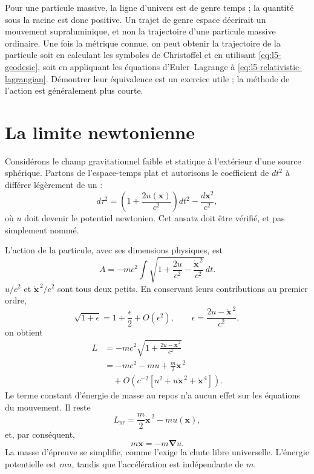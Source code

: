 Pour une particule massive, la ligne d’univers est de genre temps ; la quantité sous la racine est donc positive. Un trajet de genre espace décrirait un mouvement supraluminique, et non la trajectoire d’une particule massive ordinaire. Une fois la métrique connue, on peut obtenir la trajectoire de la particule soit en calculant les symboles de Christoffel et en utilisant \eqref{eq:l5-geodesic}, soit en appliquant les équations d’Euler--Lagrange à \eqref{eq:l5-relativistic-lagrangian}. Démontrer leur équivalence est un exercice utile ; la méthode de l’action est généralement plus courte.

\section{La limite newtonienne}

Considérons le champ gravitationnel faible et statique à l’extérieur d’une source sphérique. Partons de l’espace-temps plat et autorisons le coefficient de \(dt^2\) à différer légèrement de un :
\begin{equation}
d\tau^2
=\left(1+\frac{2u(\mathbf{x})}{c^2}\right)dt^2
-\frac{d\mathbf{x}^2}{c^2},
\label{eq:l5-weak-metric}
\end{equation}
où \(u\) doit devenir le potentiel newtonien. Cet ansatz doit être vérifié, et pas simplement nommé.

L’action de la particule, avec ses dimensions physiques, est
\begin{equation}
A=-mc^2\int
\sqrt{1+\frac{2u}{c^2}
-\frac{\dot{\mathbf{x}}^{\,2}}{c^2}}\,dt.
\label{eq:l5-weak-action}
\end{equation}
\(u/c^2\) et \(\dot{\mathbf{x}}^{\,2}/c^2\) sont tous deux petits. En conservant leurs contributions au premier ordre,
\begin{equation}
\sqrt{1+\epsilon}
=1+\frac{\epsilon}{2}+O(\epsilon^2),
\qquad
\epsilon=\frac{2u-\dot{\mathbf{x}}^{\,2}}{c^2},
\end{equation}
on obtient
\begin{align}
L
&=-mc^2
\sqrt{1+\frac{2u-\dot{\mathbf{x}}^{\,2}}{c^2}}\\
&=-mc^2-mu+\frac{m}{2}\dot{\mathbf{x}}^{\,2}\\
&\quad+O\!\left(c^{-2}
 [u^2+u\dot{\mathbf{x}}^{\,2}+\dot{\mathbf{x}}^{\,4}]\right).
\label{eq:l5-newton-expansion}
\end{align}
Le terme constant d’énergie de masse au repos n’a aucun effet sur les équations du mouvement. Il reste
\begin{equation}
L_{\mathrm{nr}}
=\frac{m}{2}\dot{\mathbf{x}}^{\,2}-m u(\mathbf{x}),
\label{eq:l5-newton-lagrangian}
\end{equation}
et, par conséquent,
\begin{equation}
m\ddot{\mathbf{x}}=-m\boldsymbol{\nabla}u.
\label{eq:l5-newton-equation}
\end{equation}
La masse d’épreuve se simplifie, comme l’exige la chute libre universelle. L’énergie potentielle est \(m u\), tandis que l’accélération est indépendante de \(m\).

